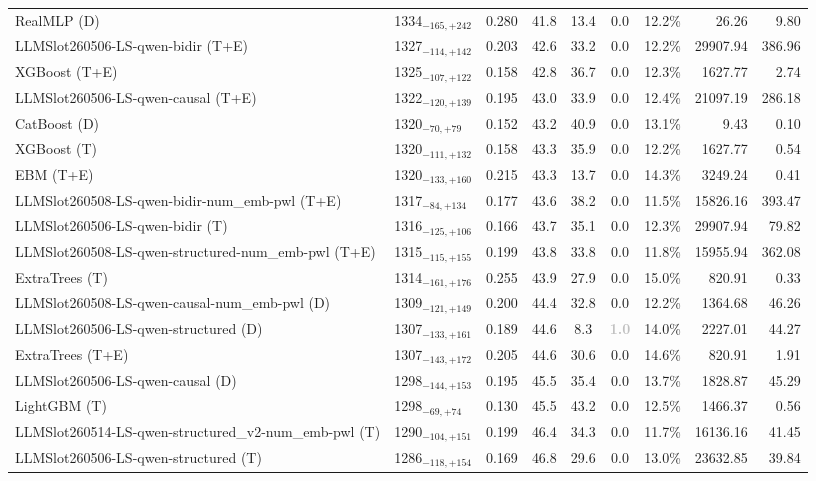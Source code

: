 \begin{tabular}{llcccccrr}
RealMLP (D) & 1334${}_{-165,+242}$ & 0.280 & 41.8 & 13.4 & 0.0 & 12.2\% & 26.26 & 9.80 \\
LLMSlot260506-LS-qwen-bidir (T+E) & 1327${}_{-114,+142}$ & 0.203 & 42.6 & 33.2 & 0.0 & 12.2\% & 29907.94 & 386.96 \\
XGBoost (T+E) & 1325${}_{-107,+122}$ & 0.158 & 42.8 & 36.7 & 0.0 & 12.3\% & 1627.77 & 2.74 \\
LLMSlot260506-LS-qwen-causal (T+E) & 1322${}_{-120,+139}$ & 0.195 & 43.0 & 33.9 & 0.0 & 12.4\% & 21097.19 & 286.18 \\
CatBoost (D) & 1320${}_{-70,+79}$ & 0.152 & 43.2 & 40.9 & 0.0 & 13.1\% & 9.43 & 0.10 \\
XGBoost (T) & 1320${}_{-111,+132}$ & 0.158 & 43.3 & 35.9 & 0.0 & 12.2\% & 1627.77 & 0.54 \\
EBM (T+E) & 1320${}_{-133,+160}$ & 0.215 & 43.3 & 13.7 & 0.0 & 14.3\% & 3249.24 & 0.41 \\
LLMSlot260508-LS-qwen-bidir-num_emb-pwl (T+E) & 1317${}_{-84,+134}$ & 0.177 & 43.6 & 38.2 & 0.0 & 11.5\% & 15826.16 & 393.47 \\
LLMSlot260506-LS-qwen-bidir (T) & 1316${}_{-125,+106}$ & 0.166 & 43.7 & 35.1 & 0.0 & 12.3\% & 29907.94 & 79.82 \\
LLMSlot260508-LS-qwen-structured-num_emb-pwl (T+E) & 1315${}_{-115,+155}$ & 0.199 & 43.8 & 33.8 & 0.0 & 11.8\% & 15955.94 & 362.08 \\
ExtraTrees (T) & 1314${}_{-161,+176}$ & 0.255 & 43.9 & 27.9 & 0.0 & 15.0\% & 820.91 & 0.33 \\
LLMSlot260508-LS-qwen-causal-num_emb-pwl (D) & 1309${}_{-121,+149}$ & 0.200 & 44.4 & 32.8 & 0.0 & 12.2\% & 1364.68 & 46.26 \\
LLMSlot260506-LS-qwen-structured (D) & 1307${}_{-133,+161}$ & 0.189 & 44.6 & 8.3 & \textcolor{silver}{\textbf{1.0}} & 14.0\% & 2227.01 & 44.27 \\
ExtraTrees (T+E) & 1307${}_{-143,+172}$ & 0.205 & 44.6 & 30.6 & 0.0 & 14.6\% & 820.91 & 1.91 \\
LLMSlot260506-LS-qwen-causal (D) & 1298${}_{-144,+153}$ & 0.195 & 45.5 & 35.4 & 0.0 & 13.7\% & 1828.87 & 45.29 \\
LightGBM (T) & 1298${}_{-69,+74}$ & 0.130 & 45.5 & 43.2 & 0.0 & 12.5\% & 1466.37 & 0.56 \\
LLMSlot260514-LS-qwen-structured_v2-num_emb-pwl (T) & 1290${}_{-104,+151}$ & 0.199 & 46.4 & 34.3 & 0.0 & 11.7\% & 16136.16 & 41.45 \\
LLMSlot260506-LS-qwen-structured (T) & 1286${}_{-118,+154}$ & 0.169 & 46.8 & 29.6 & 0.0 & 13.0\% & 23632.85 & 39.84 \\

\end{tabular}
